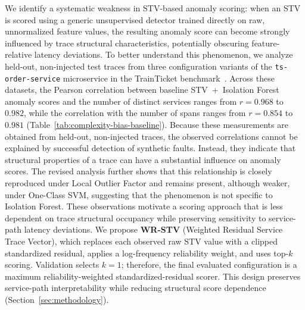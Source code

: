 \documentclass[informatics,article,submit,moreauthors]{Definitions/mdpi}
\newcommand{\rev}[1]{{\color{revisionblue}#1}}
\begin{document}
We identify a systematic weakness in STV-based anomaly scoring: when an STV is scored using a generic unsupervised detector trained directly on raw, unnormalized feature values, the resulting anomaly score can become strongly influenced by trace structural characteristics, potentially obscuring feature-relative latency deviations. To better understand this phenomenon, we analyze held-out, non-injected test traces from three configuration variants of the \texttt{ts-order-service} microservice in the TrainTicket benchmark~\cite{zhou2021trainticket}. Across these datasets, the Pearson correlation between baseline STV~+~Isolation Forest anomaly scores and the number of distinct services ranges from $r = 0.968$ to $0.982$, while the correlation with the number of spans ranges from $r = 0.854$ to $0.981$ (Table~\ref{tab:complexity-bias-baseline}). Because these measurements are obtained from held-out, non-injected traces, the observed correlations cannot be explained by successful detection of synthetic faults. Instead, they indicate that structural properties of a trace can have a substantial influence on anomaly scores. The revised analysis further shows that this relationship is closely reproduced under Local Outlier Factor and remains present, although weaker, under One-Class SVM, suggesting that the phenomenon is not specific to Isolation Forest. These observations motivate a scoring approach that is less dependent on trace structural occupancy while preserving sensitivity to service-path latency deviations.
\rev{We propose \textbf{WR-STV} (Weighted Residual Service Trace Vector),
which replaces each observed raw STV value with a clipped standardized
residual, applies a log-frequency reliability weight, and uses top-$k$
scoring. Validation selects $k=1$; therefore, the final evaluated
configuration is a maximum reliability-weighted standardized-residual scorer.
This design preserves service-path interpretability while reducing structural
score dependence (Section~\ref{sec:methodology}).}
\end{document}
